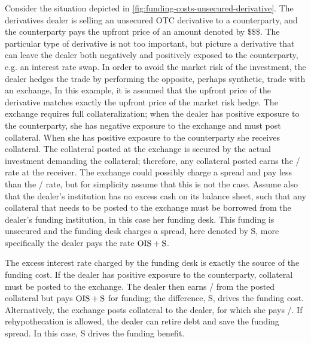 \documentclass[main.tex]{subfiles}
\begin{document}
        \begin{example}
        Consider the situation depicted in \cref{fig:funding-costs-unsecured-derivative}.
        The derivatives dealer is selling an unsecured OTC derivative to a counterparty,
        and the counterparty pays the upfront price of an amount denoted by $\$\$\$$.
        The particular type of derivative is not too important, 
        but picture a derivative that can leave the dealer both negatively and positively exposed to the counterparty, 
        e.g. an interest rate swap.
        In order to avoid the market risk of the investment, 
        the dealer hedges the trade by performing the opposite, 
        perhaps synthetic, trade with an exchange,
        In this example, it is assumed that the upfront price of the derivative 
        matches exactly the upfront price of the market risk hedge.
        The exchange requires full collateralization;
        when the dealer has positive exposure to the counterparty, 
        she has negative exposure to the exchange and must post collateral. 
        When she has positive exposure to the counterparty she receives collateral.
        The collateral posted at the exchange is secured by the actual investment demanding the collateral;
        therefore, any collateral posted earns the \OIS/ rate at the receiver.
        The exchange could possibly charge a spread and pay less than the \OIS/ rate,
        but for simplicity assume that this is not the case.
        Assume also that the dealer's institution has no excess cash on its balance sheet, 
        such that any collateral that needs to be posted to the exchange 
        must be borrowed from the dealer's funding institution,
        in this case her funding desk. 
        This funding is unsecured and the funding desk charges a spread, here denoted by S,
        more specifically the dealer pays the rate $\OIS/ + \text{S}$.

        The excess interest rate charged by the funding desk is exactly the source of the funding cost.
        If the dealer has positive exposure to the counterparty, collateral must be posted to the exchange.
        The dealer then earns \OIS/ from the posted collateral but pays $\OIS/ + \text{S}$ for funding;
        the difference, S, drives the funding cost.
        Alternatively, the exchange posts collateral to the dealer, for which she pays \OIS/.
        If rehypothecation is allowed, the dealer can retire debt and save the funding spread.
        In this case, S drives the funding benefit.
        \end{example}
\end{document}
